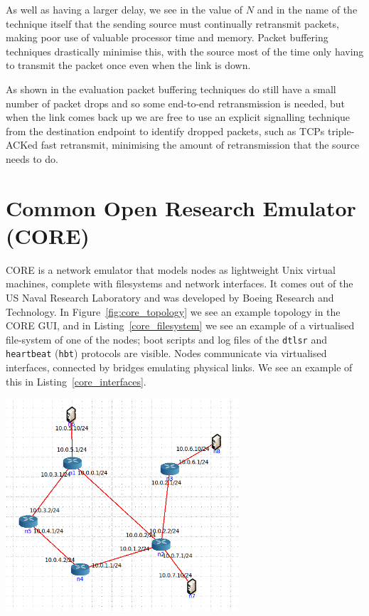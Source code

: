 \documentclass[withindex,glossary,openany]{cam-thesis}
\begin{document}
As well as having a larger delay, we see in the value of $N$ and in the name of the technique itself that the sending source must continually retransmit packets, making poor use of valuable processor time and memory. Packet buffering techniques drastically minimise this, with the source most of the time only having to transmit the packet once even when the link is down.

As shown in the evaluation packet buffering techniques do still have a small number of packet drops and so some end-to-end retransmission is needed, but when the link comes back up we are free to use an explicit signalling technique from the destination endpoint to identify dropped packets, such as TCPs triple-ACKed fast retransmit, minimising the amount of retransmission that the source needs to do.

\section{Common Open Research Emulator (CORE)}

CORE is a network emulator that models nodes as lightweight Unix virtual machines, complete with filesystems and network interfaces. It comes out of the US Naval Research Laboratory and was developed by Boeing Research and Technology. In Figure~\ref{fig:core_topology} we see an example topology in the CORE GUI, and in Listing~\ref{core_filesystem} we see an example of a virtualised file-system of one of the nodes; boot scripts and log files of the \texttt{dtlsr} and \texttt{heartbeat} (\texttt{hbt}) protocols are visible. Nodes communicate via virtualised interfaces, connected by bridges emulating physical links. We see an example of this in Listing~\ref{core_interfaces}.

\begin{center}
\begin{minipage}{0.9\textwidth} \centering
	\includegraphics[width=0.65\textwidth]{core_topology}
	\label{fig:core_topology}
\end{minipage}
\end{center}
\end{document}
